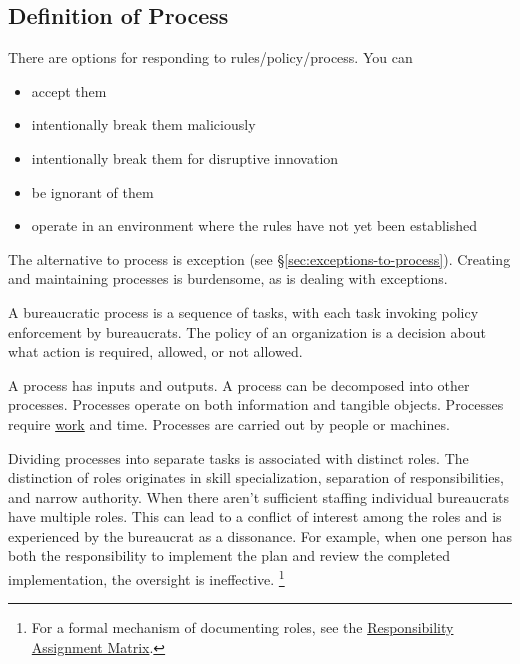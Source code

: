 \subsection{Definition of Process\label{sec:definition-of-process}}

There are options for responding to rules/policy/process. You can
\begin{itemize}
    \item accept them
    \item intentionally break them maliciously
    \item intentionally break them for disruptive innovation
    \item be ignorant of them
    \item operate in an environment where the rules have not yet been established
\end{itemize}



The alternative to process is exception (see \S\ref{sec:exceptions-to-process}). Creating and maintaining processes is burdensome, as is dealing with exceptions. 


A bureaucratic \gls{process} is a sequence of tasks, with each task invoking policy enforcement by bureaucrats. 
The policy of an organization is a decision about what action is required, allowed, or not allowed.


A process has inputs and outputs. 
A process can be decomposed into other processes. 
Processes operate on both information and tangible objects. 
Processes require \href{https://en.wikipedia.org/wiki/Work_(physics)}{work} and time. 
Processes are carried out by people or machines.

Dividing processes into separate tasks is associated with distinct roles. The distinction of roles originates in skill specialization, separation of responsibilities, and narrow authority. 
When there aren't sufficient staffing individual bureaucrats have multiple roles. This can lead to a conflict of interest among the roles and is experienced by the bureaucrat as a dissonance. For example, when one person has both the responsibility to implement the plan and review the completed implementation, the oversight is ineffective. \footnote{For a formal mechanism of documenting roles, see the 
\href{https://en.wikipedia.org/wiki/Responsibility_assignment_matrix}{Responsibility Assignment Matrix}.
}


